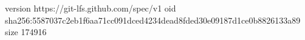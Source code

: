 version https://git-lfs.github.com/spec/v1
oid sha256:5587037c2eb1f6aa71cc091dced4234dead8fded30e09187d1ce0b8826133a89
size 174916

